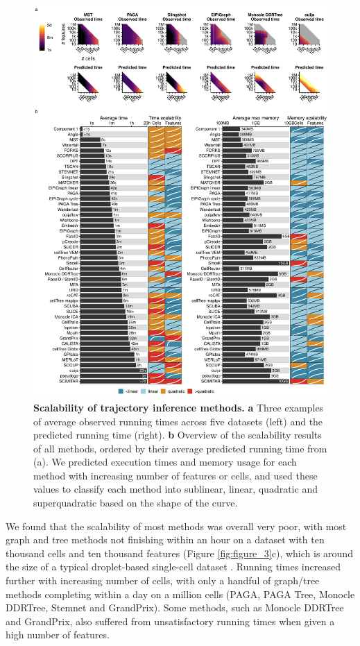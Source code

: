 \begin{figure}
	\centering\includegraphics[width=0.9\linewidth]{fig/dynbenchmark/supfigure_4.pdf}
	\caption{
		\textbf{Scalability of trajectory inference methods.}
		\textbf{a} Three examples of average observed running times across five datasets (left) and the predicted running time (right). \textbf{b} Overview of the scalability results of all methods, ordered by their average predicted running time from (a). We predicted execution times and memory usage for each method with increasing number of features or cells, and used these values to classify each method into sublinear, linear, quadratic and superquadratic based on the shape of the curve.
	}
	\label{fig:supfigure_4}
\end{figure}

We found that the scalability of most methods was overall very poor, with most graph and tree methods not finishing within an hour on a dataset with ten thousand cells and ten thousand features (Figure \ref{fig:figure_3}c), which is around the size of a typical droplet-based single-cell dataset \cite{svensson_exponentialscalingsinglecell_2018}. Running times increased further with increasing number of cells, with only a handful of graph/tree methods completing within a day on a million cells (PAGA, PAGA Tree, Monocle DDRTree, Stemnet and GrandPrix). Some methods, such as Monocle DDRTree and GrandPrix, also suffered from unsatisfactory running times when given a high number of features.

